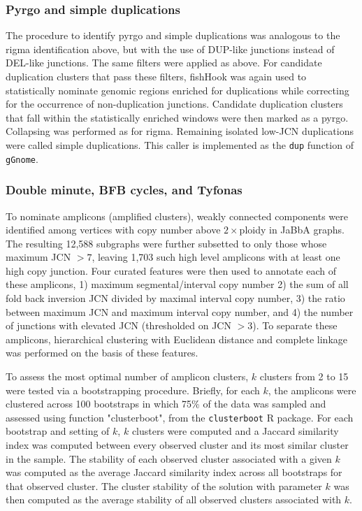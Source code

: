 \documentclass[phd,tocprelim]{cornell}
\newcommand{\ttt}[1]{\texttt{#1}}
\begin{document}
\subsubsection*{Pyrgo and simple duplications}
The procedure to identify pyrgo and simple duplications was analogous to the rigma identification above, but with the use of DUP-like junctions instead of DEL-like junctions. The same filters were applied as above. For candidate duplication clusters that pass these filters, fishHook was again used to statistically nominate genomic regions enriched for duplications while correcting for the occurrence of non-duplication junctions. Candidate duplication clusters that fall within the statistically enriched windows were then marked as a pyrgo. Collapsing was performed as for rigma. Remaining isolated low-JCN duplications were called simple duplications. This caller is implemented as the \ttt{dup} function of \ttt{gGnome}.

\subsubsection*{Double minute, BFB cycles, and Tyfonas}

To nominate amplicons (amplified clusters), weakly connected components were identified among vertices with copy number above $2\times$ploidy in JaBbA graphs. The resulting 12,588 subgraphs were further subsetted to only those whose maximum JCN $>7$, leaving 1,703 such high level amplicons with at least one high copy junction. Four curated features were then used to annotate each of these amplicons, 1) maximum segmental/interval copy number 2) the sum of all fold back inversion JCN divided by maximal interval copy number, 3) the ratio between maximum JCN and maximum interval copy number, and 4) the number of junctions with elevated JCN (thresholded on JCN $> 3$). To separate these amplicons, hierarchical clustering with Euclidean distance and complete linkage was performed on the basis of these features.


To assess the most optimal number of amplicon clusters, $k$ clusters from 2 to 15 were tested via a bootstrapping procedure.   Briefly, for each $k$, the amplicons were clustered across 100 bootstraps in which 75\% of the data was sampled and assessed using function "clusterboot", from the \texttt{clusterboot} R package. For each bootstrap and setting of $k$, $k$ clusters were computed and a Jaccard similarity index was computed between every observed cluster and its most similar cluster in the sample.  The stability of each observed cluster associated with a given $k$ was computed as the average Jaccard similarity index across all bootstraps for that observed cluster.  The cluster stability of the solution with parameter $k$ was then computed as the average stability of all observed clusters associated with $k$.
\end{document}
